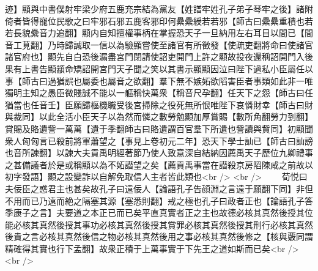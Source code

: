 迹】顯與中書僕射牢梁少府五鹿充宗結為黨友【姓譜牢姓孔子弟子琴牢之後】諸附倚者皆得寵位民歌之曰牢邪石邪五鹿客邪印何纍纍綬若若邪【師古曰纍纍重積也若若長貌纍音力追翻】顯内自知擅權事柄在掌握恐天子一旦納用左右耳目以間已【間音工莧翻】乃時歸誠取一信以為驗顯嘗使至諸官有所徵發【使疏吏翻將命曰使諸官諸官府也】顯先自白恐後漏盡宮門閉請使詔吏開門上許之顯故投夜還稱詔開門入後果有上書告顯顓命矯詔開宮門天子聞之笑以其書示顯顯因泣曰陛下過私小臣屬任以事【師古曰過猶誤也屬委也屬音之欲翻】羣下無不嫉妬欲䧟害臣者事類如此非一唯獨明主知之愚臣微賤誠不能以一軀稱快萬衆【稱音尺孕翻】任天下之怨【師古曰任猶當也任音壬】臣願歸樞機職受後宮掃除之役死無所恨唯陛下哀憐財幸【師古曰財與裁同】以此全活小臣天子以為然而憐之數勞勉顯加厚賞賜【數所角翻勞力到翻】賞賜及賂遺訾一萬萬【遺于季翻師古曰賂遺謂百官羣下所遺也訾讀與貲同】初顯聞衆人匈匈言已殺前將軍蕭望之【事見上卷初元二年】恐天下學士訕已【師古曰訕謗也音所諫翻】以諫大夫貢禹明經著節乃使人致意深自結納因薦禹天子歷位九卿禮事之甚備議者於是或稱顯以為不妬譛望之矣【薦貢禹事當在譛殺京房䧟陳咸之前故以初字發語】顯之設變詐以自解免取信人主者皆此類也<br />
<br />
　　荀悦曰夫佞臣之惑君主也甚矣故孔子曰遠佞人【論語孔子告顔淵之言遠于願翻下同】非但不用而已乃遠而絶之隔塞其源【塞悉則翻】戒之極也孔子曰政者正也【論語孔子答季康子之言】夫要道之本正已而已矣平直真實者正之主也故德必核其真然後授其位能必核其真然後授其事功必核其真然後授其賞罪必核其真然後授其刑行必核其真然後貴之言必核其真然後信之物必核其真然後用之事必核其真然後修之【核與覈同謂精確得其實也行下孟翻】故衆正積于上萬事實于下先王之道如斯而已矣<br />
<br />

